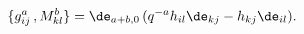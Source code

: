 \begin{equation}
\{g^a_{ij}\, ,M^b_{kl} \}=\de_{a+b,0}\,
(q^{-a}h_{il}\de_{kj}-h_{kj}\de_{il}).
\label{MPB}
\end{equation}

